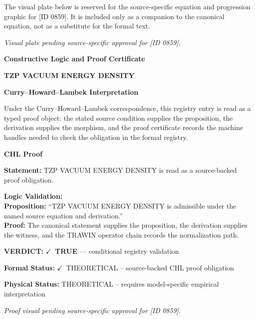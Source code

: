 \begingroup\footnotesize\sloppy
The visual plate below is reserved for the source-specific equation and progression graphic for [ID 0859]. It is included only as a companion to the canonical equation, not as a substitute for the formal text.
\par\endgroup
\begingroup\footnotesize\itshape
Visual plate pending source-specific approval for [ID 0859].
\par\endgroup

\clearpage
\begingroup\tzpsupportsetup
\noindent\textbf{\fontsize{10.8pt}{12.8pt}\selectfont [ID 0859] Constructive Logic and Proof Certificate}\par
\noindent\textbf{\fontsize{10pt}{12pt}\selectfont TZP VACUUM ENERGY DENSITY}\par
\vspace{0.45em}
\begingroup
\footnotesize
\setlength{\parskip}{0.22em}
\setlength{\parindent}{0pt}
\noindent\textbf{Curry--Howard--Lambek Interpretation}\par
Under the Curry--Howard--Lambek correspondence, this registry entry is read as a typed proof
object: the stated source condition supplies the proposition, the derivation supplies the
morphism, and the proof certificate records the machine handles needed to check the obligation
in the formal registry.

\vspace{0.45em}
\noindent\textbf{CHL Proof}\par
\textbf{Statement:} TZP VACUUM ENERGY DENSITY is read as a source-backed proof obligation.

\textbf{Logic Validation:}\\
\textbf{Proposition:} ``TZP VACUUM ENERGY DENSITY is admissible under the named source equation and derivation.''\\
\textbf{Proof:} The canonical statement supplies the proposition, the derivation supplies the witness, and the TRAWIN operator chain records the normalization path.

\textbf{VERDICT:} \ensuremath{\checkmark}\ \textbf{TRUE} --- conditional registry validation

\textbf{Formal Status:} \ensuremath{\checkmark}\ THEORETICAL -- source-backed CHL proof obligation

\textbf{Physical Status:} THEORETICAL -- requires model-specific empirical interpretation
\par\vspace{0.45em}
\par
\vfill
\begingroup\footnotesize\itshape
Proof visual pending source-specific approval for [ID 0859].
\par\endgroup
\vfill
\endgroup
\endgroup
